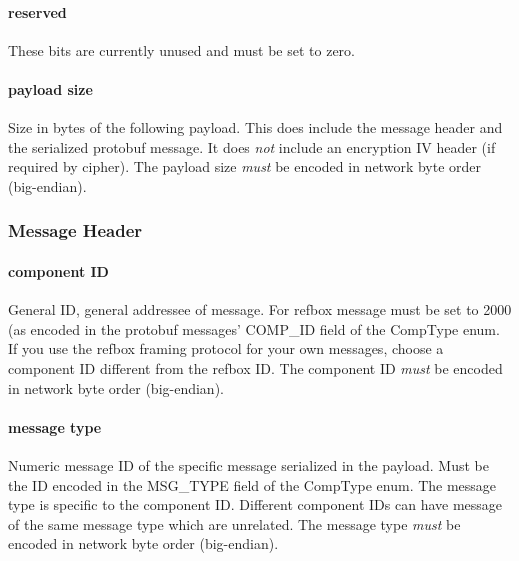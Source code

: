 \documentclass[a4paper]{article}
\begin{document}
\paragraph{reserved}
  These bits are currently unused and must be set to zero.
\paragraph{payload size} Size in bytes of the following payload. This does
  include the message header and the serialized protobuf message. It
  does \emph{not} include an encryption IV header (if required by
  cipher). The payload size \emph{must} be encoded in network byte
  order (big-endian).

\subsubsection{Message Header}
\paragraph{component ID}
General ID, general addressee of message. For refbox message must be
set to 2000 (as encoded in the protobuf messages' COMP\_ID field of
the CompType enum. If you use the refbox framing protocol for your own
messages, choose a component ID different from the refbox ID. The
component ID \emph{must} be encoded in network byte order
(big-endian).
\paragraph{message type}
Numeric message ID of the specific message serialized in the
payload. Must be the ID encoded in the MSG\_TYPE field of the CompType
enum. The message type is specific to the component ID. Different
component IDs can have message of the same message type which are
unrelated. The message type \emph{must} be encoded in network byte
order (big-endian).
\end{document}
